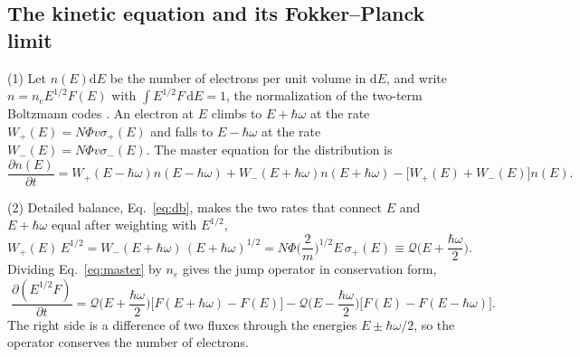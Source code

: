 \documentclass[11pt]{article}
\numberwithin{equation}{section}
\newcommand{\dd}{\mathrm d}
\begin{document}
\subsection{The kinetic equation and its Fokker--Planck limit}
\label{sec:kinetic}
{\noindent}(1) Let $n(E)\dd E$ be the number of electrons per unit volume in
$\dd E$, and write $n=n_eE^{1/2}F(E)$ with $\int E^{1/2}F\,\dd E=1$, the
normalization of the two-term Boltzmann codes \cite{HagelaarPitchford2005}.
An electron at $E$ climbs to $E+\hbar\omega$ at the rate
$W_+(E)=N\Phi v\sigma_+(E)$ and falls to $E-\hbar\omega$ at the rate
$W_-(E)=N\Phi v\sigma_-(E)$. The master equation for the distribution is
\begin{equation}
\frac{\partial n(E)}{\partial t}=W_+(E-\hbar\omega)n(E-\hbar\omega)
+W_-(E+\hbar\omega)n(E+\hbar\omega)-\big[W_+(E)+W_-(E)\big]n(E).
\label{eq:master}
\end{equation}

{\noindent}(2) Detailed balance, Eq.~\eqref{eq:db}, makes the two rates that
connect $E$ and $E+\hbar\omega$ equal after weighting with $E^{1/2}$,
\begin{equation}
W_+(E)\,E^{1/2}=W_-(E+\hbar\omega)\,(E+\hbar\omega)^{1/2}
=N\Phi\Big(\frac2m\Big)^{1/2}E\,\sigma_+(E)\equiv\mathcal Q\Big(E+\frac{\hbar\omega}2\Big).
\end{equation}
Dividing Eq.~\eqref{eq:master} by $n_e$ gives the jump operator in
conservation form,
\begin{equation}
\boxed{\;\frac{\partial(E^{1/2}F)}{\partial t}
=\mathcal Q\Big(E+\frac{\hbar\omega}2\Big)\big[F(E+\hbar\omega)-F(E)\big]
-\mathcal Q\Big(E-\frac{\hbar\omega}2\Big)\big[F(E)-F(E-\hbar\omega)\big].\;}
\label{eq:jump}
\end{equation}
The right side is a difference of two fluxes through the energies
$E\pm\hbar\omega/2$, so the operator conserves the number of electrons.
\end{document}
